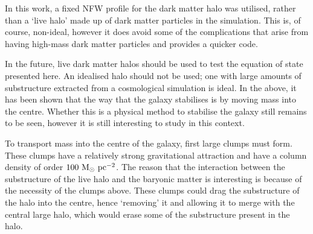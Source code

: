 In this work, a fixed NFW profile for the dark matter halo was utilised, rather than a `live halo' made up of dark matter particles in the simulation.
This is, of course, non-ideal, however it does avoid some of the complications that arise from having high-mass dark matter particles and provides a quicker code.

In the future, live dark matter halos should be used to test the equation of state presented here.
An idealised halo should not be used; one with large amounts of substructure extracted from a cosmological simulation is ideal.
In the above, it has been shown that the way that the galaxy stabilises is by moving mass into the centre.
Whether this is a physical method to stabilise the galaxy still remains to be seen, however it is still interesting to study in this context.

To transport mass into the centre of the galaxy, first large clumps must form.
These clumps have a relatively strong gravitational attraction and have a column density of order $100 ~\mathrm{M}_{\odot} ~\mathrm{pc}^{-2}$.
The reason that the interaction between the substructure of the live halo and the baryonic matter is interesting is because of the necessity of the clumps above.
These clumps could drag the substructure of the halo into the centre, hence `removing' it and allowing it to merge with the central large halo, which would erase some of the substructure present in the halo.
